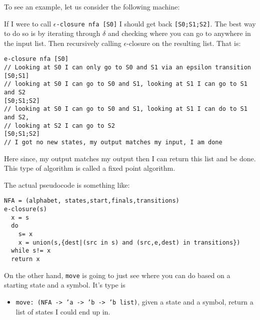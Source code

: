 \documentclass[main.tex]{subfiles}
\begin{document}
To see an example, let us consider the following machine: 
\begin{center}
\end{center}
If I were to call \texttt{$\epsilon$-closure nfa [S0]} I should get back \texttt{[S0;S1;S2]}. The best way to do so is by iterating through $\delta$ and checking where you can go to anywhere in the input list. Then recursively calling $\epsilon$-closure on the resulting list. That is:
\begin{lstlisting}
e-closure nfa [S0]
// Looking at S0 I can only go to S0 and S1 via an epsilon transition
[S0;S1]
// looking at S0 I can go to S0 and S1, looking at S1 I can go to S1 and S2
[S0;S1;S2]
// looking at S0 I can go to S0 and S1, looking at S1 I can do to S1 and S2, 
// looking at S2 I can go to S2
[S0;S1;S2]
// I got no new states, my output matches my input, I am done
\end{lstlisting}

Here since, my output matches my output then I can return this list and be done. This type of algorithm is called a fixed point algorithm. 

The actual pseudocode is something like: 
\begin{lstlisting}
NFA = (alphabet, states,start,finals,transitions)
e-closure(s)
  x = s
  do
    s= x
    x = union(s,{dest|(src in s) and (src,e,dest) in transitions})
  while s!= x
  return x
\end{lstlisting}

On the other hand, \texttt{move} is going to just see where you can do based on a starting state and a symbol. It's type is
\begin{itemize}
    \item \texttt{move: (NFA -> 'a -> 'b  -> 'b list)}, given a state and a symbol, return a list of states I could end up in.
\end{itemize}
\end{document}
